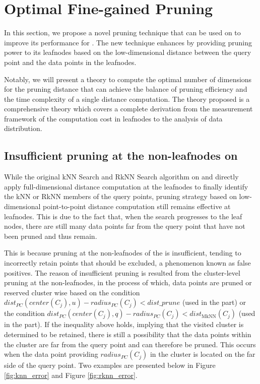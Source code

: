 \section{Optimal Fine-gained Pruning}\label{sec:pruning}



In this section, we propose a novel pruning technique that can be used on \dualtree to improve its performance for \fdknnj. The new technique enhances \dualtree by providing pruning power to its leafnodes based on the low-dimensional distance between the query point and the data points in the leafnodes.   

Notably, we will present a theory to compute the optimal number of dimensions for the pruning distance that can achieve the balance of pruning efficiency and the time complexity of a single distance computation. The theory proposed is a comprehensive theory which covers a complete derivation from the measurement framework of the computation cost in leafnodes to the analysis of data distribution. 

\subsection{Insufficient pruning at the non-leafnodes on \dualtree}
While the original kNN Search and RkNN Search algorithm on \hdrtree and \deltatree directly apply full-dimensional distance computation at the leafnodes to finally identify the kNN or RkNN members of the query points, pruning strategy based on low-dimensional point-to-point distance computation still remains effective at leafnodes. This is due to the fact that, when the search progresses to the leaf nodes, there are still many data points far from the query point that have not been pruned and thus remain. 

This is because pruning at the non-leafnodes of the \dualtree is insufficient, tending to  incorrectly retain points that should be excluded, a phenomenon known as false positives.
%
The reason of insufficient pruning is resulted from the cluster-level pruning at the non-leafnodes, in the process of which, data points are pruned or reserved cluster wise based on the condition $dist_{PC}(center(C_j), u)-radius_{PC}(C_j)<dist\_prune$ (used in the \deltatree part) or the condition $dist_{PC}(center(C_j), q) - radius_{PC}(C_j) < dist_\text{MkNN}(C_j)$ (used in the \hdrtree part). 
%
If the inequality above holds, implying that the visited cluster is determined to be retained, there is still a possibility that the data points within the cluster are far from the query point and can therefore be pruned. This occurs when the data point providing $radius_{PC}(C_j)$ in the cluster is located on the far side of the query point. Two examples are presented below in Figure \ref{fig:knn_error} and Figure \ref{fig:rknn_error}. 


